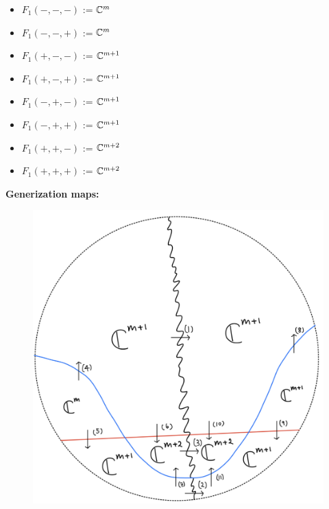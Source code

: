 \begin{itemize}
\item $F_1(-,-,-)$ := $\mathbb{C}^m$
\item $F_1(-,-,+)$ := $\mathbb{C}^m$
\item $F_1(+,-,-)$ := $\mathbb{C}^{m+1}$
\item $F_1(+,-,+)$ := $\mathbb{C}^{m+1}$
\item $F_1(-,+,-)$ := $\mathbb{C}^{m+1}$
\item $F_1(-,+,+)$ := $\mathbb{C}^{m+1}$
\item $F_1(+,+,-)$ := $\mathbb{C}^{m+2}$
\item $F_1(+,+,+)$ := $\mathbb{C}^{m+2}$
\end{itemize}

\textbf{Generization maps:}
\begin{figure}[H]
    \centering
    \includegraphics[scale = 0.95]{diagrams/lemma1/33.png} 
    \caption{}
    \label{fig:your-label}
\end{figure}
